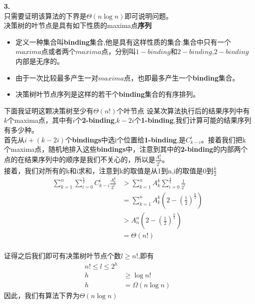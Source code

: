 \documentclass[twocolumn]{ctexart}
\begin{document}
\noindent \textbf{3.}\\
\indent 只需要证明该算法的下界是$\Theta(n\log{n})$即可说明问题。\\
\indent 决策树的叶节点是具有如下性质的maxima点\textbf{序列}\\
\begin{itemize}
	\item 定义一种集合叫\textbf{binding}集合,他是具有这样性质的集合:集合中只有一个$maxima$点或者两个$maxima$点，分别叫$1-binding$和$2-binding$,$2-binding$内部是无序的。
	\item 由于一次比较最多产生一对$maxima$点，也即最多产生一个\textbf{binding}集合。
	\item 决策树叶节点序列是这样的若干个\textbf{binding}集合的有序排列。
\end{itemize}
\indent 下面我证明这颗决策树至少有$\Theta(n!)$个叶节点
\indent 设某次算法执行后的结果序列中有$k$个maxima点，其中有$i$个\textbf{2-binding},$k-2i$个\textbf{1-binding},我们计算可能的结果序列有多少种。\\
首先从$i+(k-2i)$个\textbf{bindings}中选i个位置给\textbf{1-binding},是$ C_{k-i}^{i}$。接着我们把k个maxima点，随机地排入这些\textbf{bindings}中，注意到其中的\textbf{2-binding}的内部两个点的在结果序列中的顺序是我们不关心的，所以是$\frac{A_k^k}{2^i} $。\\
\indent
接着，我们对所有的k和i求和，注意到k的取值是从1到n,i的取值是0到$\frac{k}{2}$\\

\begin{align}
	\sum_{k=1}^{n}\sum_{i=0}^{\frac{k}{2}} C_{k-i}^i\frac{A_k^k}{2^i} 
				&>\sum_{k=1}^{n}A_k^k\sum_{i=0}^{\frac{k}{2}}\frac{1}{2^i}\nonumber\\
				&=\sum_{k=1}^{n}A_k^k(2-(\frac{1}{2})^\frac{k}{2})\nonumber\\
				&>A_n^n(2-(\frac{1}{2})^\frac{k}{2})\nonumber\\
				&=\Theta(n!)\nonumber\\
				\nonumber
\end{align}

\indent 证得之后我们即可有决策树叶节点个数$l\ge n!$,即有\\
\begin{align}
	n!\le l \le 2^h\nonumber\\
	h &\ge \log{n!}\nonumber\\
	h&=\Omega(n\log{n})\nonumber
\end{align}
因此，我们有算法下界为$\Theta(n\log{n})$
%	
\end{document}
